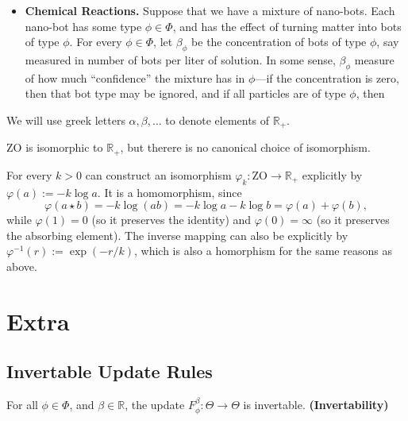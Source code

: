 \documentclass{article}
\def\ZO{\mathrm{ZO}}
\def\Rplus{\mathbb R_+}
\begin{document}
\begin{itemize}
\begin{itemize}
		\item \textbf{Chemical Reactions.} 
		Suppose that we have a mixture of nano-bots.
		Each nano-bot has some type $\phi \in \Phi$, and has the effect of turning matter into bots of type $\phi$.
		For every $\phi \in \Phi$, let $\beta_\phi$ be the concentration of bots of type $\phi$, say measured in number of bots per liter of solution.
		In some sense, $\beta_\phi$ measure of how much ``confidence'' the mixture has in $\phi$---if the concentration is zero, then that bot type may be ignored, and if all particles are of type $\phi$, then 
		
		\TODO
		
		
	\end{itemize}
	
	We will use greek letters $\alpha, \beta, \ldots$ to denote elements of $\Rplus$.

\end{itemize}


\begin{prop}
	$\ZO$ is isomorphic to $\Rplus$, but therere is no canonical choice of isomorphism.
\end{prop}
\begin{lproof}
	For every $k > 0$ can construct an isomorphism $\varphi_k: \ZO \to \Rplus$ explicitly by $\varphi(a) := - k \log a$.
	It is a homomorphism, since
	\[
		\varphi(a \star b) = - k \log (a b) = - k \log a - k \log b =
			\varphi(a) + \varphi(b),
	\]
	while $\varphi(1) = 0$ (so it preserves the identity) and $\varphi(0) = \infty$ (so it preserves the absorbing element).
	The inverse mapping can also be explicitly by $\varphi^{-1}(r) := \exp( - r / k)$, which is also a homorphism for the same reasons as above.
\end{lproof}



\clearpage
\appendix
\section{Extra}

\subsection{Invertable Update Rules}

\begin{CFaxioms}
	\item For all $\phi\in\Phi$, and $\beta \in \mathbb R$, the update
	$F^{\beta}_{\phi}: \Theta \to \Theta$ is invertable.
	\hfill\textbf{(Invertability)} \label{ax:invert}
\end{CFaxioms}
\end{document}
